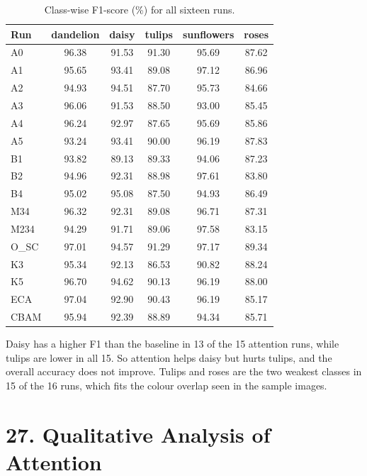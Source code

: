 \documentclass[10pt]{article}
\begin{document}
\begin{table}[H]
\centering
\caption{Class-wise F1-score (\%) for all sixteen runs.}
\begin{tabular}{|l|c|c|c|c|c|}
\hline
\textbf{Run} & \textbf{dandelion} & \textbf{daisy} & \textbf{tulips} & \textbf{sunflowers} & \textbf{roses}\\
\hline
A0 & 96.38 & 91.53 & 91.30 & 95.69 & 87.62 \\
\hline
A1 & 95.65 & 93.41 & 89.08 & 97.12 & 86.96 \\
\hline
A2 & 94.93 & 94.51 & 87.70 & 95.73 & 84.66 \\
\hline
A3 & 96.06 & 91.53 & 88.50 & 93.00 & 85.45 \\
\hline
A4 & 96.24 & 92.97 & 87.65 & 95.69 & 85.86 \\
\hline
A5 & 93.24 & 93.41 & 90.00 & 96.19 & 87.83 \\
\hline
B1 & 93.82 & 89.13 & 89.33 & 94.06 & 87.23 \\
\hline
B2 & 94.96 & 92.31 & 88.98 & 97.61 & 83.80 \\
\hline
B4 & 95.02 & 95.08 & 87.50 & 94.93 & 86.49 \\
\hline
M34 & 96.32 & 92.31 & 89.08 & 96.71 & 87.31 \\
\hline
M234 & 94.29 & 91.71 & 89.06 & 97.58 & 83.15 \\
\hline
O\_SC & 97.01 & 94.57 & 91.29 & 97.17 & 89.34 \\
\hline
K3 & 95.34 & 92.13 & 86.53 & 90.82 & 88.24 \\
\hline
K5 & 96.70 & 94.62 & 90.13 & 96.19 & 88.00 \\
\hline
ECA & 97.04 & 92.90 & 90.43 & 96.19 & 85.17 \\
\hline
CBAM & 95.94 & 92.39 & 88.89 & 94.34 & 85.71 \\
\hline
\end{tabular}
\end{table}

Daisy has a higher F1 than the baseline in 13 of the 15 attention runs, while tulips are lower in all 15. So attention helps daisy but hurts tulips, and the overall accuracy does not improve. Tulips and roses are the two weakest classes in 15 of the 16 runs, which fits the colour overlap seen in the sample images.

\section*{27. Qualitative Analysis of Attention}
\end{document}
